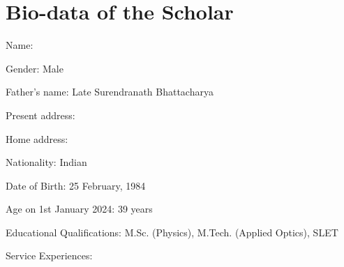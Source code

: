 \chapter{Bio-data of the Scholar} \label{appendix:biodata}

    Name: \authorname
    
    Gender: Male
    
    Father’s name: Late Surendranath Bhattacharya
    
    Present address: 
    
    Home address:
    
    Nationality: Indian
    
    Date of Birth: 25 February, 1984
    
    Age on 1st January 2024: 39 years
    
    Educational Qualifications: M.Sc. (Physics), M.Tech. (Applied Optics), SLET
    
    Service Experiences: 